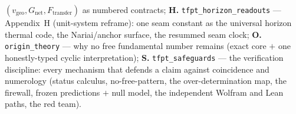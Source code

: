 \begin{navbox}
$(v_{\mathrm{geo}}, G_{\mathrm{net}}, F_{\mathrm{transfer}})$ as numbered contracts;
\textbf{H.} \texttt{tfpt\_horizon\_readouts} --- Appendix~H (unit-system reframe): one seam constant as
the universal horizon thermal code, the Nariai/anchor surface, the resummed seam clock;
\textbf{O.} \texttt{origin\_theory} --- why no free fundamental number remains (exact core $+$ one
honestly-typed cyclic interpretation);
\textbf{S.} \texttt{tfpt\_safeguards} --- the verification discipline: every mechanism that defends a claim
against coincidence and numerology (status calculus, no-free-pattern, the over-determination map, the
firewall, frozen predictions $+$ null model, the independent Wolfram and Lean paths, the red team).
\end{navbox}
